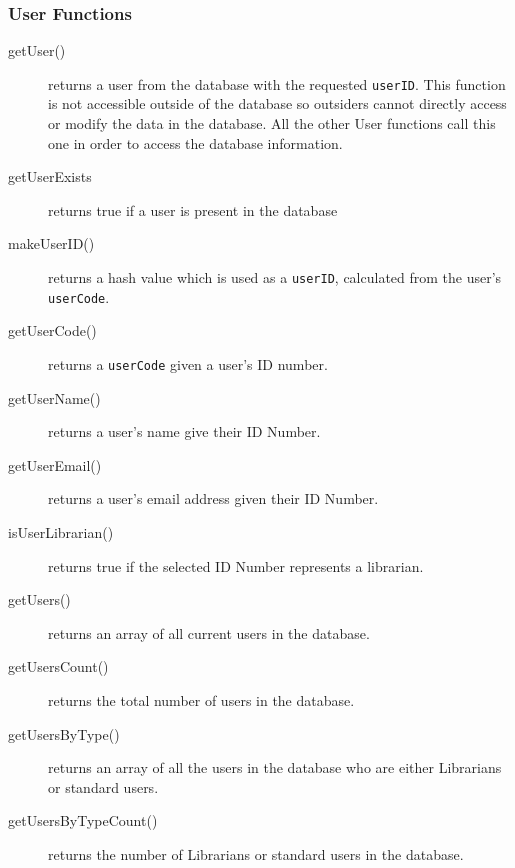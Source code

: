 \documentclass{article}
\begin{document}

\subsubsection{User Functions}
\begin{description}
\item[getUser()] returns a user from the database with the requested \verb|userID|. This function is not accessible outside of the database so outsiders cannot directly access or modify the data in the database. All the other User functions call this one in order to access the database information.
\item[getUserExists] returns true if a user is present in the database
\item[makeUserID()] returns a hash value which is used as a \verb|userID|, calculated from the user's \verb|userCode|.
\item[getUserCode()] returns a \verb|userCode| given a user's ID number.
\item[getUserName()] returns a user's name give their ID Number.
\item[getUserEmail()] returns a user's email address given their ID Number.
\item[isUserLibrarian()] returns true if the selected ID Number represents a librarian.
\item[getUsers()] returns an array of all current users in the database.
\item[getUsersCount()] returns the total number of users in the database.
\item[getUsersByType()] returns an array of all the users in the database who are either Librarians or standard users.
\item[getUsersByTypeCount()] returns the number of Librarians or standard users in the database.
\end{description}
\end{document}
